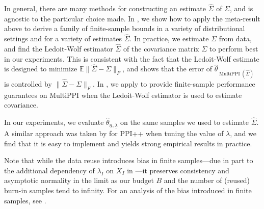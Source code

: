 \documentclass{article} %
\newcommand{\Ex}{\mathbb{E}}
\newcommand{\adam}[1]{ {\color{magenta}[AF: #1]}}
\DeclareMathOperator{\multiPPI}{MultiPPI}
\newcommand{\wh}[1]{\widehat{#1}}
\newcommand{\ul}[1]{\underline{#1}}
\begin{document}
In general, there are many methods for constructing an estimate $\wh{\Sigma}$ of $\Sigma$, and  is agnostic to the particular choice made. In , we show how to apply the meta-result above to derive a family of finite-sample bounds in a variety of distributional settings and for a variety of estimates $\wh{\Sigma}$.
In practice, we estimate ${\Sigma}$ from data, and find the Ledoit-Wolf estimator $\wh{\Sigma}$ of the covariance matrix $\Sigma$ to perform best in our experiments. This is consistent with the fact that the Ledoit-Wolf estimate is designed to minimize $\Ex \|\wh{\Sigma}-\Sigma\|_F$, and  shows that the error of $\hat{\theta}_{\multiPPI(\widehat{\Sigma})}$ is controlled by $\|\wh{\Sigma}-\Sigma\|_{F}$. In , we apply  to provide finite-sample performance guarantees on MultiPPI when the Ledoit-Wolf estimator is used to estimate covariance.

In our experiments, we evaluate $\hat{\theta}_{\ul{n},\ul{\lambda}}$ on the same samples we used to estimate $\wh{\Sigma}$. A similar approach was taken by \citet{angelopoulos2023ppi++} for PPI++ when tuning the value of $\lambda$, and we find that it is easy to implement and yields strong empirical results in practice.

Note that while the data reuse introduces bias in finite samples---due in part to the additional dependency of $\lambda_I$ on $X_I$ in ---it preserves consistency and asymptotic normality in the limit as our budget $B$ and the number of (reused) burn-in samples tend to infinity. For an analysis of the bias introduced in finite samples, see .
\end{document}
